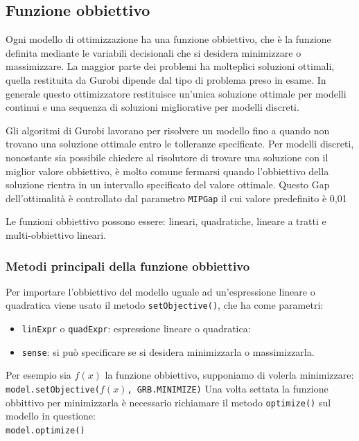 \subsection{Funzione obbiettivo}
Ogni modello di ottimizzazione ha una funzione obbiettivo, che è la funzione definita mediante le variabili decisionali che si desidera minimizzare o massimizzare.
La maggior parte dei problemi ha molteplici soluzioni ottimali, quella restituita da Gurobi dipende dal tipo di problema preso in esame.
In generale questo ottimizzatore restituisce un'unica soluzione ottimale per modelli continui e una sequenza di soluzioni migliorative per modelli discreti.

Gli algoritmi di Gurobi lavorano per risolvere un modello fino a quando non trovano una soluzione ottimale entro le tolleranze specificate.
Per modelli discreti, nonostante sia possibile chiedere al risolutore di trovare una soluzione con il miglior valore obbiettivo, è molto comune fermarsi quando l'obbiettivo della soluzione rientra in un intervallo specificato del valore ottimale.
Questo Gap dell'ottimalità è controllato dal parametro \texttt{MIPGap} il cui valore predefinito è 0,01%

Le funzioni obbiettivo possono essere: lineari, quadratiche, lineare a tratti e multi-obbiettivo lineari.

\subsubsection*{Metodi principali della funzione obbiettivo}
Per importare l'obbiettivo del modello uguale ad un'espressione lineare o quadratica viene usato il metodo \texttt{setObjective()}, che ha come parametri:
\begin{itemize}
\item \texttt{linExpr} o \texttt{quadExpr}: espressione lineare o quadratica:
\item \texttt{sense}: si può specificare se si desidera minimizzarla o massimizzarla.
\end{itemize}

Per esempio sia $f(x)$ la funzione obbiettivo, supponiamo di volerla minimizzare:\\
\texttt{model.setObjective($f(x)$, GRB.MINIMIZE)}
Una volta settata la funzione obbittivo per minimizzarla è necessario richiamare il metodo \texttt{optimize()} sul modello in questione:\\
\texttt{model.optimize()}